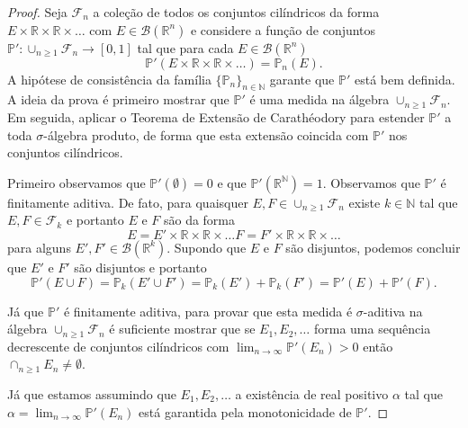 \begin{proof}
Seja $\mathcal{F}_n$ 
a coleção de todos os conjuntos cilíndricos da 
forma $E\times\mathbb{R}\times\mathbb{R}\times\ldots$
com $E\in\mathscr{B}(\mathbb{R}^n)$
e considere a função de conjuntos 
$\mathbb{P}':\cup_{n\geq 1}\mathcal{F}_n\to [0,1]$
tal que para cada $E\in\mathscr{B}(\mathbb{R}^n)$ 
\[
\mathbb{P}'(E\times\mathbb{R}\times\mathbb{R}\times\ldots)
=
\mathbb{P}_n(E).
\] 
A hipótese de consistência da família $\{\mathbb{P}_n\}_{n\in\mathbb{N}}$
garante que $\mathbb{P}'$ está bem definida. 
A ideia da prova é primeiro mostrar que $\mathbb{P}'$ é uma medida na álgebra 
$\cup_{n\geq 1}\mathcal{F}_n$. Em seguida, aplicar o 
Teorema de Extensão de Carathéodory para estender $\mathbb{P}'$
a toda $\sigma$-álgebra produto, de forma que esta 
extensão coincida com $\mathbb{P}'$ 
nos conjuntos cilíndricos.

Primeiro observamos que $\mathbb{P}'(\emptyset)=0$ 
e que $\mathbb{P}'(\mathbb{R}^{\mathbb{N}})=1$.
Observamos que $\mathbb{P}'$ é finitamente aditiva.
De fato, para quaisquer $E,F\in \cup_{n\geq 1}\mathcal{F}_n$ 
existe $k\in\mathbb{N}$ tal que $E,F\in \mathcal{F}_{k}$
e portanto $E$ e $F$ são da forma 
\[
E= E'\times\mathbb{R}\times\mathbb{R}\times\ldots
F= F'\times\mathbb{R}\times\mathbb{R}\times\ldots
\]
para alguns $E',F'\in\mathscr{B}(\mathbb{R}^k)$.
Supondo que $E$ e $F$ são disjuntos, podemos concluir que
$E'$ e $F'$ são disjuntos e portanto 
\[
\mathbb{P}'(E\cup F)
=
\mathbb{P}_{k}(E'\cup F')
=
\mathbb{P}_{k}(E')+\mathbb{P}_{k}(F')
=
\mathbb{P}'(E)+\mathbb{P}'(F).
\]

Já que $\mathbb{P}'$ é finitamente aditiva, para provar 
que esta medida é $\sigma$-aditiva na álgebra 
$\cup_{n\geq 1}\mathcal{F}_n$ é suficiente mostrar que 
se $E_1,E_2,\ldots $ forma uma sequência decrescente de 
conjuntos cilíndricos com 
$\lim_{n\to\infty}\mathbb{P}'(E_n)>0$ então 
$\cap_{n\geq 1}E_n \neq \emptyset$.


Já que estamos assumindo que 
$E_1,E_2,\ldots $ a existência de 
real positivo $\alpha$ tal que 
 $\alpha= \lim_{n\to\infty}\mathbb{P}'(E_n)$
está garantida pela monotonicidade de $\mathbb{P}'$.


\end{proof}
